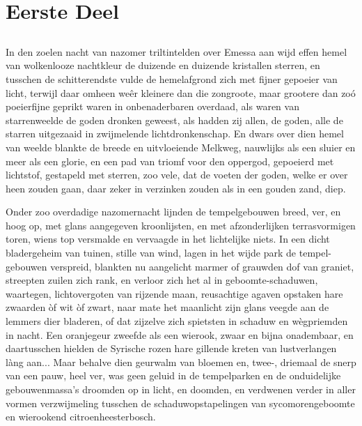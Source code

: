 \documentclass[a4paper, 12pt, oneside, dutch]{article}
\begin{document}
\pagestyle{fancy}
\fancyhf{}
\cfoot{\bfseries\large\Fontauri{\thepage}}
\Large
\setlength{\parskip}{1mm plus1mm minus1mm}
\tableofcontents
\clearpage
\section{Eerste Deel}
\subsection{}
\paragraph{}
In den zoelen nacht van nazomer triltintelden over Emessa aan wijd effen hemel van wolkenlooze nachtkleur de duizende en duizende kristallen sterren, en tusschen de schitterendste vulde de hemelafgrond zich met fijner gepoeier van licht, terwijl daar omheen weêr kleinere dan die zongroote, maar grootere dan zoó poeierfijne geprikt waren in onbenaderbaren overdaad, als waren van starrenweelde de goden dronken geweest, als hadden zij allen, de goden, alle de starren uitgezaaid in zwijmelende lichtdronkenschap. En dwars over dien hemel van weelde blankte de breede en uitvloeiende Melkweg, nauwlijks als een sluier en meer als een glorie, en een pad van triomf voor den oppergod, gepoeierd met lichtstof, gestapeld met sterren, zoo vele, dat de voeten der goden, welke er over heen zouden gaan, daar zeker in verzinken zouden als in een gouden zand, diep.

Onder zoo overdadige nazomernacht lijnden de tempelgebouwen breed, ver, en hoog op, met glans aangegeven kroonlijsten, en met afzonderlijken terrasvormigen toren, wiens top versmalde en vervaagde in het lichtelijke niets. In een dicht bladergeheim van tuinen, stille van wind, lagen in het wijde park de tempel-gebouwen verspreid, blankten nu aangelicht marmer of grauwden dof van graniet, streepten zuilen zich rank, en verloor zich het al in geboomte-schaduwen, waartegen, lichtovergoten van rijzende maan, reusachtige agaven opstaken hare zwaarden òf wit òf zwart, naar mate het maanlicht zijn glans veegde aan de lemmers dier bladeren, of dat zijzelve zich spietsten in schaduw en wègpriemden in nacht. Een oranjegeur zweefde als een wierook, zwaar en bijna onadembaar, en daartusschen hielden de Syrische rozen hare gillende kreten van lustverlangen làng aan... Maar behalve dien geurwalm van bloemen en, twee-, driemaal de snerp van een pauw, heel ver, was geen geluid in de tempelparken en de onduidelijke gebouwenmassa's droomden op in licht, en doomden, en verdwenen verder in aller vormen verzwijmeling tusschen de schaduwopstapelingen van sycomorengeboomte en wierookend citroenheesterbosch.
\end{document}
